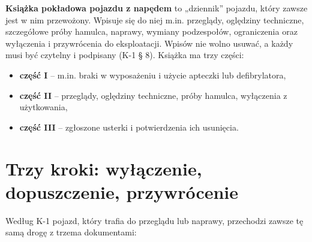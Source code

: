 \textbf{Książka pokładowa pojazdu z napędem} to „dziennik” pojazdu, który zawsze jest w nim przewożony. Wpisuje się do niej m.in. przeglądy, oględziny techniczne, szczegółowe próby hamulca, naprawy, wymiany podzespołów, ograniczenia oraz wyłączenia i przywrócenia do eksploatacji. Wpisów nie wolno usuwać, a każdy musi być czytelny i podpisany (K-1 § 8). Książka ma trzy części:
\begin{itemize}
	\item \textbf{część I} – m.in. braki w wyposażeniu i użycie apteczki lub defibrylatora,
	\item \textbf{część II} – przeglądy, oględziny techniczne, próby hamulca, wyłączenia z użytkowania,
	\item \textbf{część III} – zgłoszone usterki i potwierdzenia ich usunięcia.
\end{itemize}

\section{Trzy kroki: wyłączenie, dopuszczenie, przywrócenie}

Według K-1 pojazd, który trafia do przeglądu lub naprawy, przechodzi zawsze tę samą drogę z trzema dokumentami:

\begin{center}
\end{center}

